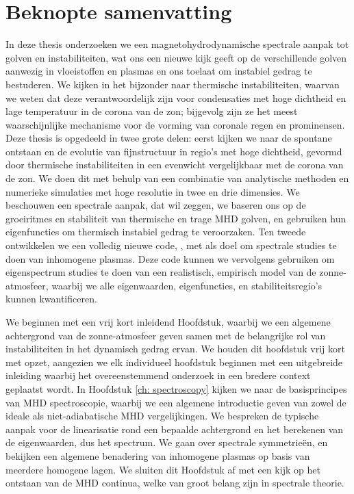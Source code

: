 \chapter*{Beknopte samenvatting} \label{ch: abstract_nl}
In deze thesis onderzoeken we een magnetohydrodynamische spectrale aanpak tot golven en instabiliteiten, wat ons een nieuwe kijk geeft op de verschillende golven aanwezig in vloeistoffen en plasmas en ons toelaat om instabiel gedrag te bestuderen. We kijken in het bijzonder naar thermische instabiliteiten, waarvan we weten dat deze verantwoordelijk zijn voor condensaties met hoge dichtheid en lage temperatuur in de corona van de zon; bijgevolg zijn ze het meest waarschijnlijke mechanisme voor de vorming van coronale regen en prominensen. Deze thesis is opgedeeld in twee grote delen: eerst kijken we naar de spontane ontstaan en de evolutie van fijnstructuur in regio's met hoge dichtheid, gevormd door thermische instabiliteiten in een evenwicht vergelijkbaar met de corona van de zon. We doen dit met behulp van een combinatie van analytische methoden en numerieke simulaties met hoge resolutie in twee en drie dimensies. We beschouwen een spectrale aanpak, dat wil zeggen, we baseren ons op de groeiritmes en stabiliteit van thermische en trage MHD golven, en gebruiken hun eigenfuncties om thermisch instabiel gedrag te veroorzaken. Ten tweede ontwikkelen we een volledig nieuwe code, {\legolas}, met als doel om spectrale studies te doen van inhomogene plasmas. Deze code kunnen we vervolgens gebruiken om eigenspectrum studies te doen van een realistisch, empirisch model van de zonne-atmosfeer, waarbij we alle eigenwaarden, eigenfuncties, en stabiliteitsregio's kunnen kwantificeren.

We beginnen met een vrij kort inleidend Hoofdstuk, waarbij we een algemene achtergrond van de zonne-atmosfeer geven samen met de belangrijke rol van instabiliteiten in het dynamisch gedrag ervan. We houden dit hoofdstuk vrij kort met opzet, aangezien we elk individueel hoofdstuk beginnen met een uitgebreide inleiding waarbij het overeenstemmend onderzoek in een bredere context geplaatst wordt. In Hoofdstuk \ref{ch: spectroscopy} kijken we naar de basisprincipes van MHD spectroscopie, waarbij we een algemene introductie geven van zowel de ideale als niet-adiabatische MHD vergelijkingen. We bespreken de typische aanpak voor de linearisatie rond een bepaalde achtergrond en het berekenen van de eigenwaarden, dus het spectrum. We gaan over spectrale symmetrieën, en bekijken een algemene benadering van inhomogene plasmas op basis van meerdere homogene lagen. We sluiten dit Hoofdstuk af met een kijk op het ontstaan van de MHD continua, welke van groot belang zijn in spectrale theorie.

